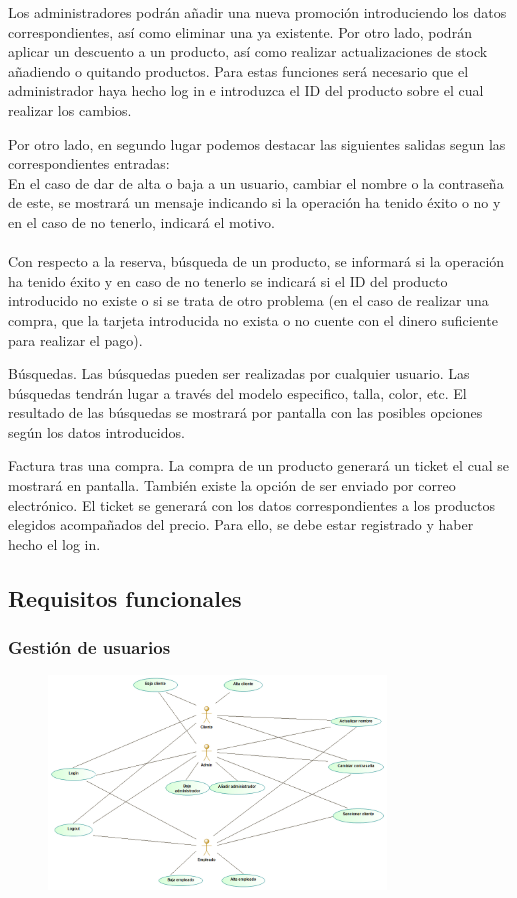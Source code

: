 Los administradores podrán añadir una nueva promoción introduciendo los datos correspondientes, así como eliminar una ya existente. Por otro lado, podrán aplicar un descuento a un producto, así como realizar actualizaciones de stock añadiendo o quitando productos. Para estas funciones será necesario que el administrador haya hecho log in e introduzca el ID del producto sobre el cual realizar los cambios.\vspace{5mm}

Por otro lado, en segundo lugar podemos destacar las siguientes salidas segun las correspondientes entradas:\\
En el caso de dar de alta o baja a un usuario, cambiar el nombre o la contraseña de este, se mostrará un mensaje indicando si la operación ha tenido éxito o no y en el caso de no tenerlo, indicará el motivo.\\\\
Con respecto a la reserva, búsqueda de un producto, se informará si la operación ha tenido éxito y en caso de no tenerlo se indicará si el ID del producto introducido no existe o si se trata de otro problema (en el caso de realizar una compra, que la tarjeta introducida no exista o no cuente con el dinero suficiente para realizar el pago).\vspace{5mm}

Búsquedas. Las búsquedas pueden ser realizadas por cualquier usuario. Las búsquedas tendrán lugar a través del modelo especifico, talla, color, etc. El resultado de las búsquedas se mostrará por pantalla con las posibles opciones según los datos introducidos.\vspace{5mm}

Factura tras una compra. La compra de un producto generará un ticket el cual se mostrará en pantalla. También existe la opción de ser enviado por correo electrónico. El ticket se generará con los datos correspondientes a los productos elegidos acompañados del precio. Para ello, se debe estar registrado y haber hecho el log in.


\subsection{Requisitos funcionales}
\subsubsection{Gestión de usuarios}%
\begin{figure}[H]
    \centering
    \includegraphics[width = 0.8\textwidth]{Use_Cases/Gestion_Usuarios.png}
\end{figure}
\newpage
